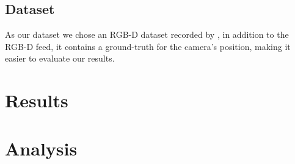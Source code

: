 \documentclass[a4paper]{article}
\begin{document}
\subsection{Dataset}

As our dataset we chose an RGB-D dataset recorded by \cite{sturm11rss-rgbd}, in addition to the RGB-D feed, it contains a ground-truth for the camera's position, making it easier to evaluate our results.

\section{Results}




\section{Analysis}




{}

\end{document}
